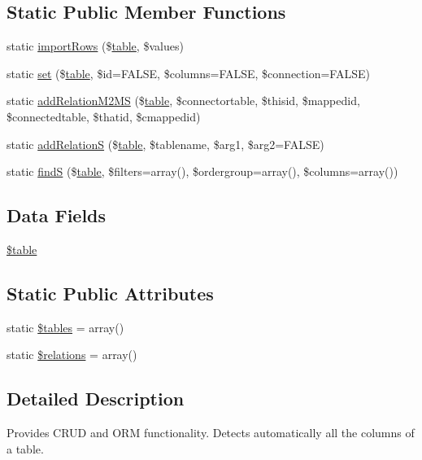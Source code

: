 \subsection*{Static Public Member Functions}
\begin{DoxyCompactItemize}
\item 
static \hyperlink{classtable_a0b7ba4f111f6cd48fadd4c61966cc308}{importRows} (\$\hyperlink{classtable}{table}, \$values)
\item 
static \hyperlink{classtable_a6c52ede0b29dff2c2aaf5a9f7c220de0}{set} (\$\hyperlink{classtable}{table}, \$id=FALSE, \$columns=FALSE, \$connection=FALSE)
\item 
static \hyperlink{classtable_a9b398e8dfd316739e74a7d19f2d988f0}{addRelationM2MS} (\$\hyperlink{classtable}{table}, \$connectortable, \$thisid, \$mappedid, \$connectedtable, \$thatid, \$cmappedid)
\item 
static \hyperlink{classtable_aa3af4eeabe0a499ae25ef80fc93abbbd}{addRelationS} (\$\hyperlink{classtable}{table}, \$tablename, \$arg1, \$arg2=FALSE)
\item 
static \hyperlink{classtable_ae5daa73e570561db01a6198d85c50a1d}{findS} (\$\hyperlink{classtable}{table}, \$filters=array(), \$ordergroup=array(), \$columns=array())
\end{DoxyCompactItemize}
\subsection*{Data Fields}
\begin{DoxyCompactItemize}
\item 
\hyperlink{classtable_ae8876a14058f368335baccf35af4a22b}{\$table}
\end{DoxyCompactItemize}
\subsection*{Static Public Attributes}
\begin{DoxyCompactItemize}
\item 
static \hyperlink{classtable_a3d332a3c374a53802495dcb045f6133f}{\$tables} = array()
\item 
static \hyperlink{classtable_a5787b67dccb801e89f4ff779d42edece}{\$relations} = array()
\end{DoxyCompactItemize}


\subsection{Detailed Description}
Provides CRUD and ORM functionality. Detects automatically all the columns of a table. 

